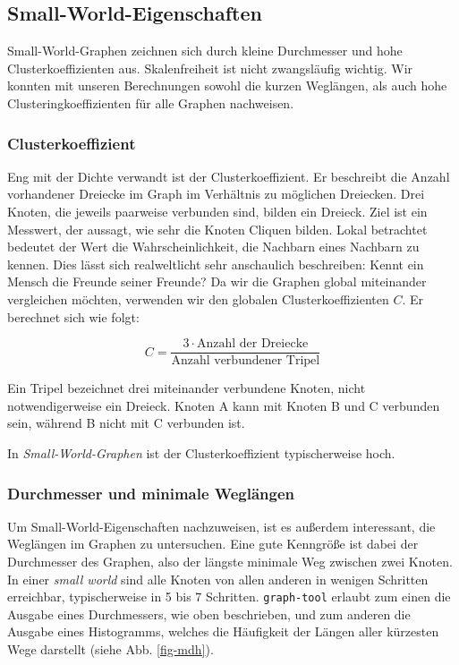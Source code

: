 \documentclass[11pt, a4paper]{article}
\begin{document}
\subsection{Small-World-Eigenschaften}
Small-World-Graphen zeichnen sich durch kleine Durchmesser und
hohe Clusterkoeffizienten aus. Skalenfreiheit ist nicht zwangsläufig wichtig.
Wir konnten mit unseren Berechnungen sowohl die kurzen Weglängen, als auch hohe
Clusteringkoeffizienten für alle Graphen nachweisen.

\subsubsection{Clusterkoeffizient}

Eng mit der Dichte verwandt ist der Clusterkoeffizient. Er beschreibt die
Anzahl vorhandener Dreiecke im Graph im Verhältnis zu möglichen Dreiecken. Drei
Knoten, die jeweils paarweise verbunden sind, bilden ein Dreieck. Ziel ist ein
Messwert, der aussagt, wie sehr die Knoten Cliquen bilden. Lokal betrachtet
bedeutet der Wert die Wahrscheinlichkeit, die Nachbarn eines Nachbarn zu kennen.
Dies lässt sich realweltlicht sehr anschaulich beschreiben: Kennt ein Mensch die 
Freunde seiner Freunde?
Da wir die Graphen global miteinander vergleichen möchten, verwenden wir den
globalen Clusterkoeffizienten $C$. Er berechnet sich wie folgt:

$$
    C = \frac{3\cdot\text{Anzahl der Dreiecke}}{\text{Anzahl verbundener Tripel}}
$$

Ein Tripel bezeichnet drei miteinander verbundene Knoten, nicht
notwendigerweise ein Dreieck. Knoten A kann mit Knoten B und C verbunden sein,
während B nicht mit C verbunden ist.

In \emph{Small-World-Graphen} ist der Clusterkoeffizient typischerweise hoch. 

\subsubsection{Durchmesser und minimale Wegl\"angen}
Um Small-World-Eigenschaften nachzuweisen, ist es außerdem interessant, die
Weglängen im Graphen zu untersuchen. Eine gute Kenngröße ist dabei der Durchmesser
des Graphen, also der längste minimale Weg zwischen zwei Knoten. In einer
\emph{small world} sind alle Knoten von allen anderen in wenigen Schritten
erreichbar, typischerweise in 5 bis 7 Schritten. \texttt{graph-tool}
erlaubt zum einen die Ausgabe eines Durchmessers, wie oben beschrieben, und zum
anderen die Ausgabe eines Histogramms, welches die Häufigkeit der Längen aller
kürzesten Wege darstellt (siehe Abb. \ref{fig-mdh}).
\end{document}

